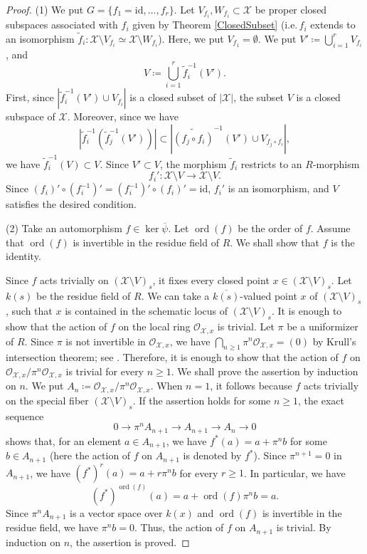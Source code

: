 \documentclass[11pt,reqno,oneside]{amsart}
\numberwithin{equation}{section}
\theoremstyle{definition}
\DeclareMathOperator{\ord}{ord}
\begin{document}
\begin{proof}
(1) We put $G = \{ f_1=\mathrm{id},\ldots,f_r \}$.
Let $V_{f_i}, W_{f_{i}} \subset \mathcal{X}$ be proper closed subspaces
associated with $f_i$ given by Theorem \ref{ClosedSubset} (i.e.\,$f_{i}$ extends to an isomorphism $\widetilde{f}_{i}\colon \mathcal{X} \setminus V_{f_{i}} \simeq \mathcal{X} \setminus W_{f_{i}}$).
Here, we put $V_{f_{1}} = \emptyset$.
We put $V'\coloneqq\bigcup_{i = 1}^{r} V_{f_i} $,
and 
\[
V\coloneqq \bigcup_{i=1}^{r} \widetilde{f}_{i}^{-1}(V').
\] 
First, since $|\widetilde{f}_{i}^{-1}(V') \cup V_{f_{i}}|$ is a closed subset of $|\mathcal{X}|$, the subset $V$ is a closed subspace of $\mathcal{X}$.
Moreover, since we have 
\[
|\widetilde{f}_{i}^{-1}( \widetilde{f}_{j}^{-1}(V'))| \subset
|\widetilde{(f_{j}\circ f_{i})}^{-1}(V') \cup V_{f_{j} \circ f_{i}}|,
\]
we have $\widetilde{f}_{i}^{-1}(V) \subset V$.
Since $V' \subset V$, the morphism $\widetilde{f}_{i}$ restricts to an  $R$-morphism 
\[
f_{i}' \colon
\mathcal{X} \setminus V \rightarrow \mathcal{X} \setminus V.
\]
Since $(f_{i})' \circ (f_{i}^{-1})' =(f_{i}^{-1})' \circ (f_{i})' = \mathrm{id}$,
$f_{i}'$ is an isomorphism, and $V$ satisfies the desired condition.

(2)
Take an automorphism $f \in \ker \overline{\psi}$.
Let $\ord(f)$ be the order of $f$.
Assume that $\ord(f)$ is invertible in the residue field of $R$.
We shall show that $f$ is the identity.

Since $f$ acts trivially on $(\mathcal{X} \setminus V)_{s}$,
it fixes every closed point $x \in (\mathcal{X} \setminus V)_{s}$.
Let $k(s)$ be the residue field of $R$.
We can take a $\overline{k(s)}$-valued point $x$ of $(\mathcal{X} \setminus V)_{s}$, such that $x$ is contained in the schematic locus of $(\mathcal{X} \setminus V)_{s}$.
It is enough to show that the action of $f$ on the local ring $\mathscr{O}_{\mathcal{X},x}$ is trivial. 
Let $\pi$ be a uniformizer of $R$.
Since $\pi$ is not invertible in $\mathscr{O}_{\mathcal{X}, x}$,
we have $\bigcap_{n \geq 1} \pi^n \mathscr{O}_{\mathcal{X}, x} = (0)$ by Krull's intersection theorem; see \cite[Theorem 8.10]{Matsumura1989}.
Therefore, it is enough to show that
the action of $f$ on 
$\mathscr{O}_{\mathcal{X}, x}/\pi^n \mathscr{O}_{\mathcal{X}, x}$
is trivial for every $n \geq 1$.
We shall prove the assertion by induction on $n$.
We put $A_n \coloneqq \mathscr{O}_{\mathcal{X}, x}/\pi^{n} \mathscr{O}_{\mathcal{X}, x}$.
When $n = 1$, it follows because $f$ acts trivially on
the special fiber $(\mathcal{X} \setminus V)_{s}$.
If the assertion holds for some $n \geq 1$, the exact sequence
\[
0 \to \pi^n A_{n+1}
  \to A_{n+1}
  \to A_{n}
  \to 0
\]
shows that, for an element $a \in A_{n+1}$,
we have $f^{\ast}(a) = a + \pi^n b$ for some $b \in A_{n+1}$
(here the action of $f$ on $A_{n+1}$ is denoted by $f^{\ast}$).
Since $\pi^{n+1} = 0$ in $A_{n+1}$,
we have $(f^{\ast})^r(a) = a + r \pi^n b$ for every $r \geq 1$.
In particular, we have
\[ (f^{\ast})^{\ord(f)}(a) = a + \ord(f) \pi^n b = a. \]
Since $\pi^n A_{n+1}$ is a vector space over $k(x)$
and $\ord(f)$ is invertible in the residue field,
we have $\pi^n b = 0$.
Thus, the action of $f$ on $A_{n+1}$ is trivial.
By induction on $n$, the assertion is proved.
\end{proof}
\end{document}
